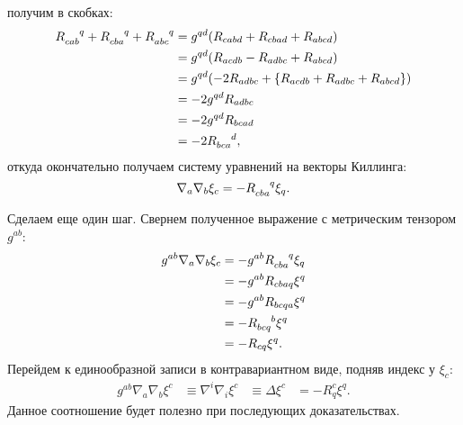 \documentclass[12pt,a4paper]{article}
\begin{document}
        получим в скобках:
        \begin{equation}\begin{aligned}
            R_{cab}^{\hphantom{cab}q} +
            R_{cba}^{\hphantom{cba}q} +
            R_{abc}^{\hphantom{abc}q}
                &= g^{qd} \qty(
                    R_{cabd} + R_{cbad} + R_{abcd}
                ) \\
                &= g^{qd} \qty(
                    R_{acdb} - R_{adbc} + R_{abcd}
                ) \\
                &= g^{qd} \qty(
                    - 2 R_{adbc} + \qty{ R_{acdb} + R_{adbc} + R_{abcd} }
                ) \\
                &= - 2 g^{qd} R_{adbc} \\
                &= - 2 g^{qd} R_{bcad} \\
                &= - 2 R_{bca}^{\hphantom{bca}d} ,
        \end{aligned}\end{equation}
        откуда окончательно получаем систему уравнений на векторы Киллинга:
        \begin{equation}\label{eq:killing_eq}
            \nabla_a \nabla_b \xi_c = - R_{cba}^{\hphantom{cba}q} \xi_q .
        \end{equation}

        Сделаем еще один шаг. Свернем полученное выражение с метрическим тензором $g^{ab}$:
        \begin{equation}\begin{aligned}
            g^{ab} \nabla_a \nabla_b \xi_c
                &= - g^{ab} R_{cba}^{\hphantom{cba}q} \xi_q \\
                &= - g^{ab} R_{cbaq} \xi^q \\
                &= - g^{ab} R_{bcqa} \xi^q \\
                &= - R_{bcq}^{\hphantom{bcq}b} \xi^q \\
                &= - R_{cq} \xi^q .
        \end{aligned}\end{equation}
        Перейдем к единообразной записи в контравариантном виде, подняв индекс у $\xi_c$:
        \begin{equation}\begin{aligned}\label{eq:killing_eq_lap}
            g^{ab} \nabla_a \nabla_b \xi^c
                &\equiv \nabla^i \nabla_i \xi^c
                &\equiv \Delta \xi^c
                &= - R^c_q \xi^q .
        \end{aligned}\end{equation}
        Данное соотношение будет полезно при последующих доказательствах.
\end{document}
